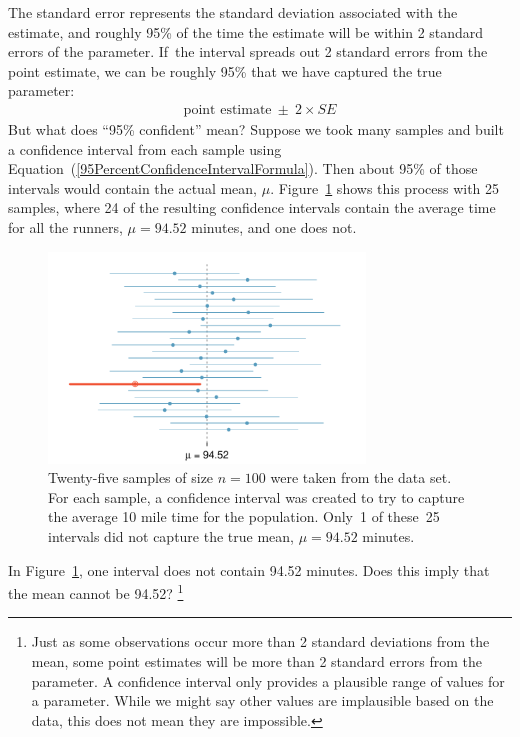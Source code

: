 The standard error represents the standard deviation associated with the estimate, and roughly 95\% of the time the estimate will be within 2 standard errors of the parameter. If~the interval spreads out 2 standard errors from the point estimate, we can be roughly 95\%  that we have captured the true parameter:
\begin{eqnarray}
\text{point estimate}\ \pm\ 2\times SE
\label{95PercentConfidenceIntervalFormula}
\end{eqnarray}
But what does ``95\% confident'' mean? Suppose we took many samples and built a confidence interval from each sample using Equation~(\ref{95PercentConfidenceIntervalFormula}). Then about 95\% of those intervals would contain the actual mean, $\mu$. Figure~\ref{95PercentConfidenceInterval} shows this process with 25 samples, where 24 of the resulting confidence intervals contain the average time for all the runners, $\mu=94.52$ minutes, and one does not.

\begin{figure}[hht]
   \centering
   \includegraphics[width=0.75\textwidth]{ch_inference_foundations/figures/95PercentConfidenceInterval/95PercentConfidenceInterval}
   \caption{Twenty-five samples of size $n=100$ were taken from the  data set. For each sample, a confidence interval was created to try to capture the average 10 mile time for the population. Only~1 of these~25 intervals did not capture the true mean, $\mu = 94.52$ minutes.}
   \label{95PercentConfidenceInterval}
\end{figure}

\begin{exercise}
In Figure~\ref{95PercentConfidenceInterval}, one interval does not contain 94.52 minutes. Does this imply that the mean cannot be 94.52? \footnote{Just as some observations occur more than 2 standard deviations from the mean, some point estimates will be more than 2 standard errors from the parameter. A confidence interval only provides a plausible range of values for a parameter. While we might say other values are implausible based on the data, this does not mean they are impossible.}
\end{exercise}

